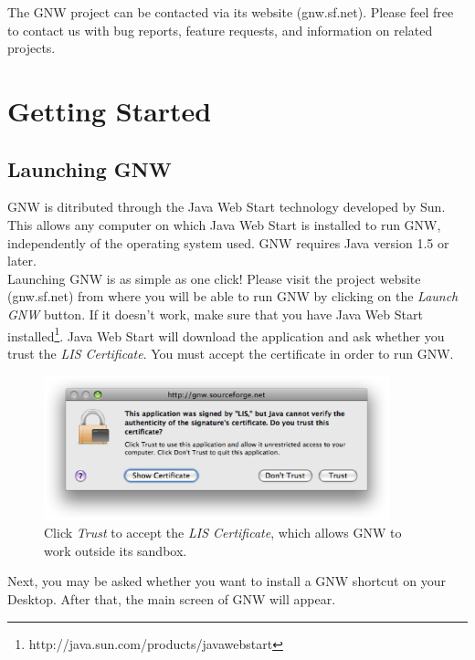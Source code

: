 \documentclass{llncs}
\begin{document}
The GNW project can be contacted via its website (gnw.sf.net). Please feel free to contact us with bug reports, feature requests, and information on related projects.

\pagebreak


\section{Getting Started}

\subsection{Launching GNW}

GNW is ditributed through the Java Web Start technology developed by Sun. This allows any computer on which Java Web Start is installed to run GNW, independently of the operating system used. GNW requires Java version 1.5 or later.\\

Launching GNW is as simple as one click! Please visit the project website (gnw.sf.net) from where you will be able to run GNW by clicking on the \emph{Launch GNW} button. If it doesn't work, make sure that you have Java Web Start installed\footnote{http://java.sun.com/products/javawebstart}. Java Web Start will download the application and ask whether you trust the \emph{LIS Certificate}. You must accept the certificate in order to run GNW.

\begin{figure}[h!]
\centering\includegraphics[width=10cm]{figures/certificate}
\caption{Click \emph{Trust} to accept the \emph{LIS Certificate}, which allows GNW to work outside its sandbox.}
\end{figure}

Next, you may be asked whether you want to install a GNW shortcut on your Desktop. After that, the main screen of GNW will appear.\\
\end{document}
